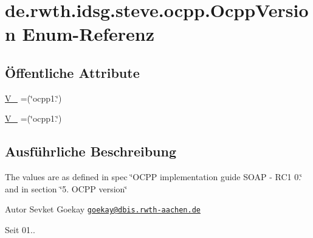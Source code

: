 \hypertarget{enumde_1_1rwth_1_1idsg_1_1steve_1_1ocpp_1_1_ocpp_version}{\section{de.\-rwth.\-idsg.\-steve.\-ocpp.\-Ocpp\-Version Enum-\/\-Referenz}
\label{enumde_1_1rwth_1_1idsg_1_1steve_1_1ocpp_1_1_ocpp_version}
}
\subsection*{Öffentliche Attribute}
\begin{DoxyCompactItemize}
\item 
\hyperlink{enumde_1_1rwth_1_1idsg_1_1steve_1_1ocpp_1_1_ocpp_version_a02a262b834136db4a30bb9a821c77574}{V\-\_} =(\char`\"{}ocpp1.\char`\"{})
\item 
\hyperlink{enumde_1_1rwth_1_1idsg_1_1steve_1_1ocpp_1_1_ocpp_version_a73e998996dec6fa643fc3241249866d4}{V\-\_} =(\char`\"{}ocpp1.\char`\"{})
\end{DoxyCompactItemize}


\subsection{Ausführliche Beschreibung}
The values are as defined in spec \char`\"{}\-O\-C\-P\-P implementation guide S\-O\-A\-P -\/ R\-C1 0.\char`\"{} and in section \char`\"{}5. O\-C\-P\-P version\char`\"{}

\begin{DoxyAuthor}{Autor}
Sevket Goekay \href{mailto:goekay@dbis.rwth-aachen.de}{\tt goekay@dbis.\-rwth-\/aachen.\-de} 
\end{DoxyAuthor}
\begin{DoxySince}{Seit}
01.. 
\end{DoxySince}


